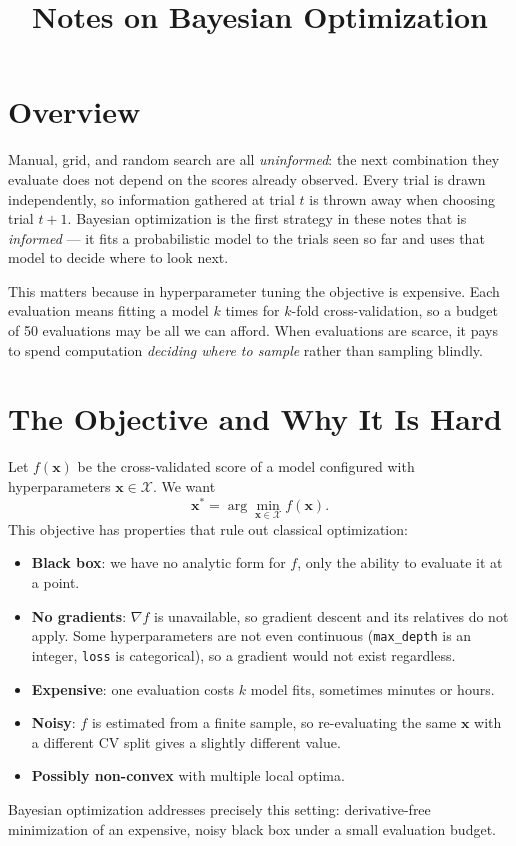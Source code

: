 \documentclass[conference]{IEEEtran}
\title{Notes on Bayesian Optimization}
\author{
\IEEEauthorblockN{Luis Mendez}
}
\begin{document}
\maketitle

\section*{Overview}
Manual, grid, and random search are all \textit{uninformed}: the next combination they evaluate does not depend on the scores already observed. Every trial is drawn independently, so information gathered at trial $t$ is thrown away when choosing trial $t+1$. Bayesian optimization is the first strategy in these notes that is \textit{informed} --- it fits a probabilistic model to the trials seen so far and uses that model to decide where to look next.

This matters because in hyperparameter tuning the objective is expensive. Each evaluation means fitting a model $k$ times for $k$-fold cross-validation, so a budget of 50 evaluations may be all we can afford. When evaluations are scarce, it pays to spend computation \textit{deciding where to sample} rather than sampling blindly.

\section*{The Objective and Why It Is Hard}
Let $f(\mathbf{x})$ be the cross-validated score of a model configured with hyperparameters $\mathbf{x} \in \mathcal{X}$. We want
\begin{equation}
    \mathbf{x}^{*} = \arg\min_{\mathbf{x} \in \mathcal{X}} f(\mathbf{x}).
\end{equation}
This objective has properties that rule out classical optimization:
\begin{itemize}
    \item \textbf{Black box}: we have no analytic form for $f$, only the ability to evaluate it at a point.
    \item \textbf{No gradients}: $\nabla f$ is unavailable, so gradient descent and its relatives do not apply. Some hyperparameters are not even continuous (\texttt{max\_depth} is an integer, \texttt{loss} is categorical), so a gradient would not exist regardless.
    \item \textbf{Expensive}: one evaluation costs $k$ model fits, sometimes minutes or hours.
    \item \textbf{Noisy}: $f$ is estimated from a finite sample, so re-evaluating the same $\mathbf{x}$ with a different CV split gives a slightly different value.
    \item \textbf{Possibly non-convex} with multiple local optima.
\end{itemize}
Bayesian optimization addresses precisely this setting: derivative-free minimization of an expensive, noisy black box under a small evaluation budget.
\end{document}
